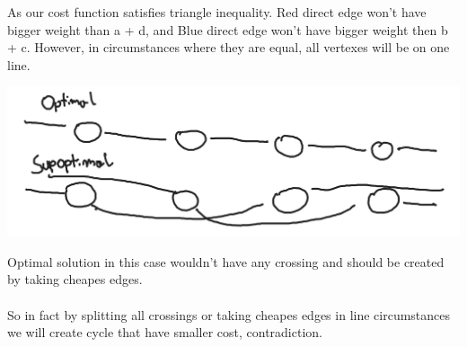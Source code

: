\documentclass{article}
\begin{document}
As our cost function satisfies triangle inequality. Red direct edge won't have bigger weight than a + d, and Blue direct edge won't have bigger  weight then b + c. However, in circumstances where they are equal, all vertexes will be on one line.
\begin{center}
    \includegraphics[scale=0.14]{6} 
\end{center}
Optimal solution in this case wouldn't have any crossing and should be created by taking cheapes edges. \\
\\
So in fact by splitting all crossings or taking cheapes edges in line circumstances we will create cycle that have smaller cost, contradiction.
\end{document}
